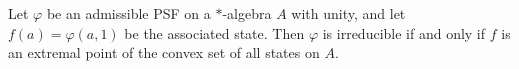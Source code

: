 Let $\varphi$ be an admissible PSF on a $*$-algebra $A$ with unity, and let $f(a) = \varphi(a, 1)$ be the associated state. Then $\varphi$ is irreducible if and only if $f$ is an extremal point of the convex set of all states on $A$.
